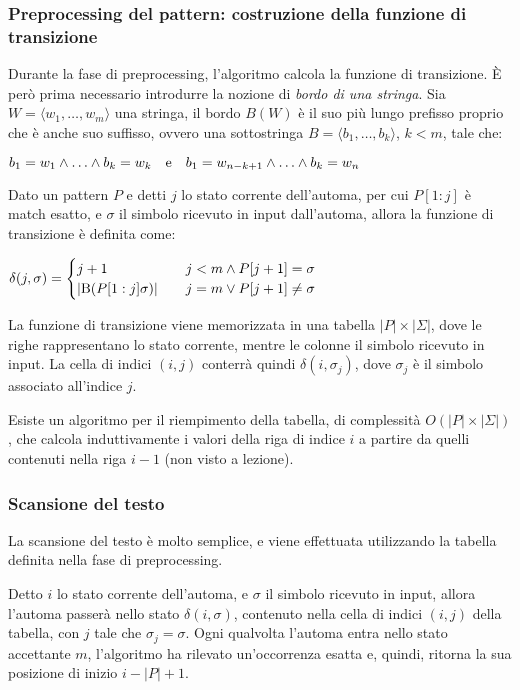 \subsubsection{Preprocessing del pattern: costruzione della funzione di transizione}
Durante la fase di preprocessing, l'algoritmo calcola la funzione di transizione.
È però prima necessario introdurre la nozione di \textit{bordo di una stringa}. Sia $W = \langle w_1, \ldots, w_m \rangle$ una stringa, il bordo $B(W)$ è il suo più lungo prefisso proprio che è anche suo suffisso, ovvero una sottostringa $B = \langle b_1, \ldots, b_k \rangle$, $k < m$, tale che:
\begin{center}
    $b_1 = w_1 \land \ldots \land b_k = w_k \quad \textnormal{e} \quad b_1 = w_{n-k+1} \land \ldots \land b_k = w_n$
\end{center} 
Dato un pattern $P$ e detti $j$ lo stato corrente dell'automa, per cui $P[1:j]$ è match esatto, e $\sigma$ il simbolo ricevuto in input dall'automa, allora la funzione di transizione è definita come:
\begin{center}
    $\delta (j, \sigma) = \begin{cases}
        j+1 & \quad j < m \land P[j+1] = \sigma \\
        \vert \textnormal{B}(P[1:j]\sigma) \vert & \quad j = m \lor P[j+1] \neq \sigma 
    \end{cases}$
\end{center}
La funzione di transizione viene memorizzata in una tabella $|P| \times |\Sigma|$, dove le righe rappresentano lo stato corrente, mentre le colonne il simbolo ricevuto in input.
La cella di indici $(i, j)$ conterrà quindi $\delta (i, \sigma_j)$, dove $\sigma_j$ è il simbolo associato all'indice $j$.

Esiste un algoritmo per il riempimento della tabella, di complessità $O(|P| \times |\Sigma|)$, che calcola induttivamente i valori della riga di indice $i$ a partire da quelli contenuti nella riga $i-1$ (non visto a lezione). 

\subsubsection{Scansione del testo}
La scansione del testo è molto semplice, e viene effettuata utilizzando la tabella definita nella fase di preprocessing.

Detto $i$ lo stato corrente dell'automa, e $\sigma$ il simbolo ricevuto in input, allora l'automa passerà nello stato $\delta (i, \sigma)$, contenuto nella cella di indici $(i, j)$ della tabella, con $j$ tale che $\sigma_j = \sigma$.
Ogni qualvolta l'automa entra nello stato accettante $m$, l'algoritmo ha rilevato un'occorrenza esatta e, quindi, ritorna la sua posizione di inizio $i - |P| + 1$.

